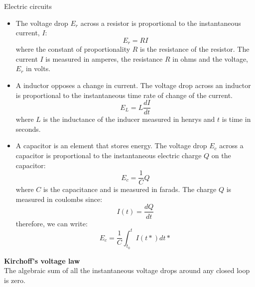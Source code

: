 \begin{testv}{Electric circuits}{}
\begin{itemize}
\item The voltage drop $E_r$ across a resistor is proportional to the instantaneous current, $I$:
\begin{equation}
\boxed{E_r = RI}
\end{equation}
where the constant of proportionality $R$ is the resistance of the resistor. The current $I$ is measured in amperes, the resistance $R$ in ohms and the voltage, $E_r$ in volts. 
\item A inductor opposes a change in current. The voltage drop across an inductor is proportional to the instantaneous time rate of change of the current.
\begin{equation}
\boxed{E_L = L\frac{dI}{dt}}
\end{equation}
where $L$ is the inductance of the inducer measured in henrys and $t$ is time in seconds.
\item A capacitor is an element that stores energy. The voltage drop $E_c$ across a capacitor is proportional to the instantaneous electric charge $Q$ on the capacitor:
 \begin{equation}
\boxed{E_c = \frac{1}{C}Q}
\end{equation}
where $C$ is the capacitance and is measured in farads. The charge $Q$ is measured in coulombs since:
 \begin{equation}
I(t) = \frac{dQ}{dt}
\end{equation}
therefore, we can write:
 \begin{equation}
E_c = \frac{1}{C}\int^t_{t_0}I(t*) dt*
\end{equation}
\end{itemize}
\textbf{Kirchoff's voltage law}\\
The algebraic sum of all the instantaneous voltage drops around any closed loop is zero.

\end{testv}

\updateinfo[October 1, 2018]
